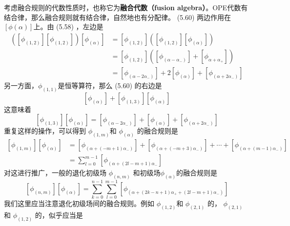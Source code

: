 考虑融合规则的代数性质时，也称它为\textbf{融合代数（fusion algebra）}。OPE代数有结合律，那么融合规则就有结合律，自然地也有分配律。 (5.60) 两边作用在 $[\phi(\alpha)] $上。由 (5.58) ，左边是
\begin{equation}
	\begin{aligned} \left(\left[\phi_{(1,2)}\right]\left[\phi_{(1,2)}\right]\right)\left[\phi_{(\alpha)}\right] &=\left[\phi_{(1,2)}\right]\left(\left[\phi_{(1,2)}\right]\left[\phi_{(\alpha)}\right]\right) \\ &=\left[\phi_{(1,2)}\right]\left(\left[\phi_{\left(\alpha-\alpha_{-}\right)}\right]+\left[\phi_{\alpha+\alpha_{+}}\right]\right) \\ &=\left[\phi_{\left(\alpha-2 \alpha_{-}\right)}\right]+2\left[\phi_{(\alpha)}\right]+\left[\phi_{\left(\alpha+2 \alpha_{-}\right)}\right] \end{aligned}
\end{equation}
另一方面，$ \phi_{(1,1)} $是恒等算符，那么 (5.60) 的右边是
\begin{equation}
	\left[\phi_{(\alpha)}\right]+\left[\phi_{(1,3)}\right]\left[\phi_{(\alpha)}\right]
\end{equation}
这意味着
\begin{equation}
	\left[\phi_{(1,3)}\right]\left[\phi_{(\alpha)}\right]=\left[\phi_{\left(\alpha-2 \alpha_{-}\right)}\right]+\left[\phi_{(\alpha)}\right]+\left[\phi_{\left(\alpha+2 \alpha_{-}\right)}\right]
\end{equation}
重复这样的操作，可以得到 $\phi_{(1, m)} $和 $\phi_{(\alpha)}$ 的融合规则是
\begin{equation}
	\begin{aligned} \left[\phi_{(1, m)}\right]\left[\phi_{(\alpha)}\right] &=\left[\phi_{\left(\alpha+(-m+1) \alpha_{-}\right)}\right]+\left[\phi_{\left(\alpha+(-m+3) \alpha_{-}\right)}\right]+\cdots+\left[\phi_{\left(\alpha+(m-1) \alpha_{-}\right)}\right] \\ &=\sum_{l=0}^{m-1}\left[\phi_{\left(\alpha+(2 l-m+1) \alpha_{-}\right.}\right] \end{aligned}
\end{equation}
对这进行推广，一般的退化初级场 $\phi_{(n, m)}$ 和初级场$ \phi_{(\alpha)} $的融合规则是
\begin{equation}
	\left[\phi_{(n, m)}\right]\left[\phi_{(\alpha)}\right]=\sum_{k=0}^{n-1} \sum_{l=0}^{m-1}\left[\phi_{\left(\alpha+(2 k-n+1) \alpha_{+}+(2 l-m+1) \alpha_{-}\right)}\right]
\end{equation}
我们这里应当注意退化初级场间的融合规则。例如 $\phi_{(1,2)} $和 $\phi_{(2,1)}$ 的， $\phi_{(2,1)} $和 $\phi_{(1,2)}$ 的，似乎应当是
